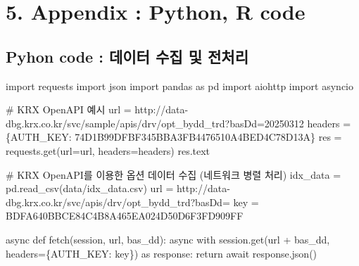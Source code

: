 \documentclass[
  a4paper,
  DIV=11,
  numbers=noendperiod]{scrreprt}
\newenvironment{Shaded}{\begin{snugshade}}{\end{snugshade}}
\newcommand{\CommentTok}[1]{\textcolor[rgb]{0.37,0.37,0.37}{#1}}
\newcommand{\ControlFlowTok}[1]{\textcolor[rgb]{0.00,0.23,0.31}{#1}}
\newcommand{\ImportTok}[1]{\textcolor[rgb]{0.00,0.46,0.62}{#1}}
\newcommand{\KeywordTok}[1]{\textcolor[rgb]{0.00,0.23,0.31}{#1}}
\newcommand{\NormalTok}[1]{\textcolor[rgb]{0.00,0.23,0.31}{#1}}
\newcommand{\OperatorTok}[1]{\textcolor[rgb]{0.37,0.37,0.37}{#1}}
\newcommand{\StringTok}[1]{\textcolor[rgb]{0.13,0.47,0.30}{#1}}
\begin{document}
\newpage

\section*{5. Appendix : Python, R code}\label{appendix-python-r-code}


\subsection*{Pyhon code : 데이터 수집 및
전처리}\label{pyhon-code-uxb370uxc774uxd130-uxc218uxc9d1-uxbc0f-uxc804uxcc98uxb9ac}

\begin{Shaded}
\begin{Highlighting}[]
\ImportTok{import}\NormalTok{ requests}
\ImportTok{import}\NormalTok{ json}
\ImportTok{import}\NormalTok{ pandas }\ImportTok{as}\NormalTok{ pd}
\ImportTok{import}\NormalTok{ aiohttp}
\ImportTok{import}\NormalTok{ asyncio}

\CommentTok{\# KRX OpenAPI 예시}
\NormalTok{url }\OperatorTok{=} \StringTok{\textquotesingle{}http://data{-}dbg.krx.co.kr/svc/sample/apis/drv/opt\_bydd\_trd?basDd=20250312\textquotesingle{}}
\NormalTok{headers }\OperatorTok{=}\NormalTok{ \{}\StringTok{\textquotesingle{}AUTH\_KEY\textquotesingle{}}\NormalTok{: }\StringTok{\textquotesingle{}74D1B99DFBF345BBA3FB4476510A4BED4C78D13A\textquotesingle{}}\NormalTok{\}}
\NormalTok{res }\OperatorTok{=}\NormalTok{ requests.get(url}\OperatorTok{=}\NormalTok{url, headers}\OperatorTok{=}\NormalTok{headers)}
\NormalTok{res.text}

\CommentTok{\# KRX OpenAPI를 이용한 옵션 데이터 수집 (네트워크 병렬 처리)}
\NormalTok{idx\_data }\OperatorTok{=}\NormalTok{ pd.read\_csv(}\StringTok{\textquotesingle{}data/idx\_data.csv\textquotesingle{}}\NormalTok{)}
\NormalTok{url }\OperatorTok{=} \StringTok{\textquotesingle{}http://data{-}dbg.krx.co.kr/svc/apis/drv/opt\_bydd\_trd?basDd=\textquotesingle{}}
\NormalTok{key }\OperatorTok{=} \StringTok{\textquotesingle{}BDFA640BBCE84C4B8A465EA024D50D6F3FD909FF\textquotesingle{}}

\ControlFlowTok{async} \KeywordTok{def}\NormalTok{ fetch(session, url, bas\_dd):}
    \ControlFlowTok{async} \ControlFlowTok{with}\NormalTok{ session.get(url }\OperatorTok{+}\NormalTok{ bas\_dd, headers}\OperatorTok{=}\NormalTok{\{}\StringTok{\textquotesingle{}AUTH\_KEY\textquotesingle{}}\NormalTok{: key\}) }\ImportTok{as}\NormalTok{ response:}
        \ControlFlowTok{return} \ControlFlowTok{await}\NormalTok{ response.json()}


\end{Highlighting}
\end{Shaded}
\end{document}
